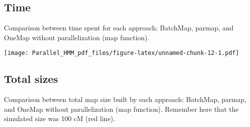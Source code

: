 \documentclass[]{article}
\newenvironment{Shaded}{\begin{snugshade}}{\end{snugshade}}
\newcommand{\CommentTok}[1]{\textcolor[rgb]{0.56,0.35,0.01}{\textit{#1}}}
\newcommand{\DataTypeTok}[1]{\textcolor[rgb]{0.13,0.29,0.53}{#1}}
\newcommand{\DecValTok}[1]{\textcolor[rgb]{0.00,0.00,0.81}{#1}}
\newcommand{\KeywordTok}[1]{\textcolor[rgb]{0.13,0.29,0.53}{\textbf{#1}}}
\newcommand{\NormalTok}[1]{#1}
\newcommand{\OperatorTok}[1]{\textcolor[rgb]{0.81,0.36,0.00}{\textbf{#1}}}
\newcommand{\StringTok}[1]{\textcolor[rgb]{0.31,0.60,0.02}{#1}}
\begin{document}
\hypertarget{time}{%
\subsection{Time}\label{time}}

Comparison between time spent for each approach: BatchMap, parmap, and
OneMap without parallelization (map function).

\begin{Shaded}
\end{Shaded}

\texttt{[image: Parallel\_HMM\_pdf\_files/figure-latex/unnamed-chunk-12-1.pdf]}

\hypertarget{total-sizes}{%
\subsection{Total sizes}\label{total-sizes}}

Comparison between total map size built by each approach: BatchMap,
parmap, and OneMap without parallelization (map function). Remember here
that the simulated size was 100 cM (red line).
\end{document}

